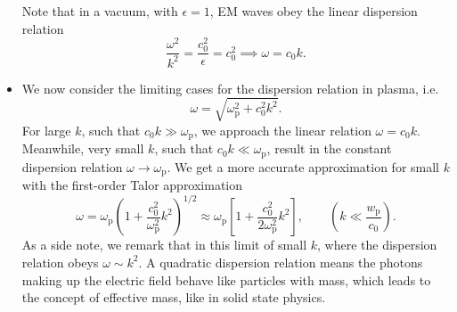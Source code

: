 \documentclass[11pt, a4paper]{article}
\newcommand{\e}{\epsilon}
\begin{document}
\begin{itemize}
	
	
	Note that in a vacuum, with $ \e = 1 $, EM waves obey the linear dispersion relation
	\begin{equation*}
		\frac{\omega^{2}}{k^{2}} = \frac{c_{0}^{2}}{\e} = c_{0}^{2} \implies \omega = c_{0}k.
	\end{equation*}
	
	\item We now consider the limiting cases for the dispersion relation in plasma, i.e.
	\begin{equation*}
		 \omega = \sqrt{\omega_{\mathrm{p}}^{2} + c_{0}^{2}k^{2}}.
	\end{equation*}
	For large $ k $, such that $ c_{0}k \gg \omega_{\text{p}} $, we approach the linear relation $ \omega = c_{0}k $. Meanwhile, very small $ k $, such that $ c_{0}k \ll \omega_{\text{p}} $, result in the constant dispersion relation $ \omega \to \omega_{\mathrm{p}} $. We get a more accurate approximation for small $ k $ with the first-order Talor approximation
	\begin{equation*}
		\omega = \omega_{\mathrm{p}}\left(1 + \frac{c_{0}^{2}}{\omega_{\mathrm{p}}^{2}} k^{2}\right)^{1/2} \approx \omega_{\mathrm{p}}\left[1 + \frac{c_{0}^{2}}{2 \omega_{\mathrm{p}}^{2}}k^{2}\right], \qquad \left(k \ll \frac{w_{\text{p}}}{c_{0}}\right).
	\end{equation*}
	As a side note, we remark that in this limit of small $ k $, where the dispersion relation obeys $ \omega \sim k^{2} $. A quadratic dispersion relation means the photons making up the electric field behave like particles with mass, which leads to the concept of effective mass, like in solid state physics.
\end{itemize}
\end{document}
